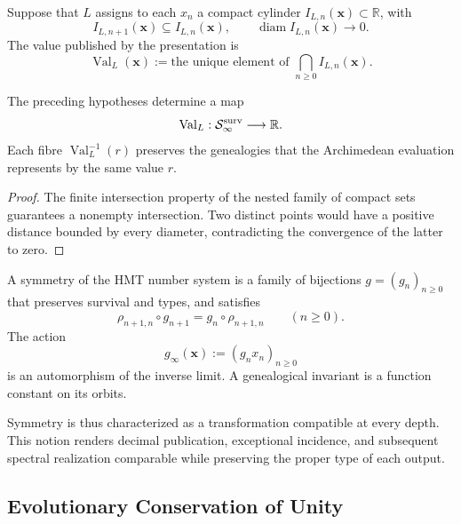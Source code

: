 \begin{definition}
\label{p3-83-c44-s2:def:valor-arquimediano-cierre-genealogico}
Suppose that \(L\) assigns to each \(x_n\) a compact cylinder
\(I_{L,n}(\boldsymbol x)\subset\mathbb R\), with
\[
 I_{L,n+1}(\boldsymbol x)\subseteq I_{L,n}(\boldsymbol x),
 \qquad
 \operatorname{diam}I_{L,n}(\boldsymbol x)\longrightarrow0.
\]
The value published by the presentation is
\[
 \operatorname{Val}_L(\boldsymbol x)
 :=\text{the unique element of }
 \bigcap_{n\geq0}I_{L,n}(\boldsymbol x).
\]
\end{definition}

\begin{proposition}
\label{p3-83-c44-s2:prop:evaluacion-seccion-genealogica}
The preceding hypotheses determine a map
\[
 \operatorname{Val}_L:\mathcal S_\infty^{\rm surv}\longrightarrow\mathbb R.
\]
Each fibre \(\operatorname{Val}_L^{-1}(r)\) preserves the genealogies that the
Archimedean evaluation represents by the same value \(r\).
\end{proposition}

\begin{proof}
The finite intersection property of the nested family of compact sets
guarantees a nonempty intersection. Two distinct points would have a
positive distance bounded by every diameter, contradicting the
convergence of the latter to zero.
\end{proof}

\begin{definition}
\label{p3-83-c44-s2:def:simetria-genealogica-hmt}
A symmetry of the HMT number system is a family of bijections
\(g=(g_n)_{n\geq0}\) that preserves survival and types, and satisfies
\[
 \rho_{n+1,n}\circ g_{n+1}
 =g_n\circ\rho_{n+1,n}
 \qquad(n\geq0).
\]
The action
\[
 g_\infty(\boldsymbol x):=(g_n x_n)_{n\geq0}
\]
is an automorphism of the inverse limit. A genealogical invariant is a
function constant on its orbits.
\end{definition}

Symmetry is thus characterized as a transformation compatible at every
depth. This notion renders decimal publication, exceptional
incidence, and subsequent spectral realization comparable while preserving the
proper type of each output.

\subsection{Evolutionary Conservation of Unity}

